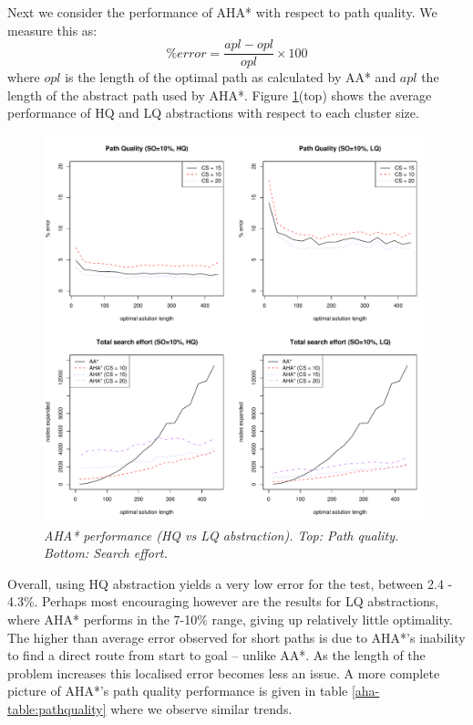 \par \indent
Next we consider the performance of AHA* with respect to path quality. We measure this as:
$$ \%error = \frac{apl - opl}{opl} \times 100 $$ where $opl$ is the length of the optimal path as calculated by AA* and $apl$ the length of the abstract path used by AHA*.
Figure \ref{aha-fig:allgraphs}(top) shows the average performance of HQ and LQ abstractions with respect to each cluster size. 
\begin{figure}[htbp]
       \caption{\small{\emph{AHA* performance (HQ vs LQ abstraction). Top: Path quality. Bottom: Search effort. }}}
       \begin{center}
                       \includegraphics[scale=0.35]{diagrams/allgraphs.pdf}
       \end{center}
       \label{aha-fig:allgraphs}
\end{figure}
Overall, using HQ abstraction yields a very low error for the test, between 2.4 - 4.3\%. 
Perhaps most encouraging however are the results for LQ abstractions, where AHA* performs in the 7-10\% range, giving up relatively little optimality. 
The higher than average error observed for short paths is due to AHA*'s inability to find a direct route from start to goal -- unlike AA*.
As the length of the problem increases this localised error becomes less an issue.
A more complete picture of AHA*'s path quality performance is given in table \ref{aha-table:pathquality} where we observe similar trends. 
